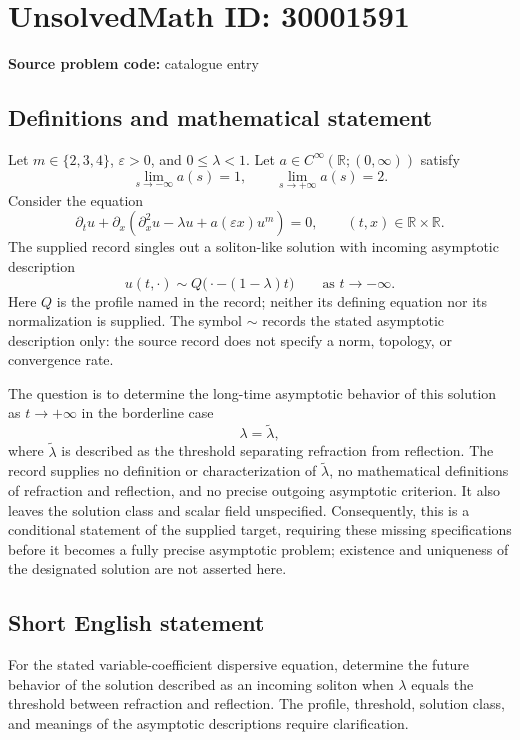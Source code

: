 \documentclass[11pt]{article}
\newcommand{\R}{\mathbb{R}}
\begin{document}
\section*{UnsolvedMath ID: 30001591}
\textbf{Source problem code:} catalogue entry
\subsection{Definitions and mathematical statement}
Let \(m\in\{2,3,4\}\), \(\varepsilon>0\), and \(0\leq\lambda<1\). Let \(a\in C^\infty(\R;(0,\infty))\) satisfy
\[
\lim_{s\to-\infty}a(s)=1,
\qquad
\lim_{s\to+\infty}a(s)=2.
\]
Consider the equation
\[
\partial_tu+\partial_x\!\left(\partial_x^2u-\lambda u+a(\varepsilon x)u^m\right)=0,
\qquad (t,x)\in\R\times\R.
\]
The supplied record singles out a soliton-like solution with incoming asymptotic description
\[
u(t,\cdot)\sim Q\bigl(\cdot-(1-\lambda)t\bigr)
\qquad\text{as }t\to-\infty.
\]
Here \(Q\) is the profile named in the record; neither its defining equation nor its normalization is supplied. The symbol \(\sim\) records the stated asymptotic description only: the source record does not specify a norm, topology, or convergence rate.

The question is to determine the long-time asymptotic behavior of this solution as \(t\to+\infty\) in the borderline case
\[
\lambda=\widetilde\lambda,
\]
where \(\widetilde\lambda\) is described as the threshold separating refraction from reflection. The record supplies no definition or characterization of \(\widetilde\lambda\), no mathematical definitions of refraction and reflection, and no precise outgoing asymptotic criterion. It also leaves the solution class and scalar field unspecified. Consequently, this is a conditional statement of the supplied target, requiring these missing specifications before it becomes a fully precise asymptotic problem; existence and uniqueness of the designated solution are not asserted here.
\subsection{Short English statement}
For the stated variable-coefficient dispersive equation, determine the future behavior of the solution described as an incoming soliton when \(\lambda\) equals the threshold between refraction and reflection. The profile, threshold, solution class, and meanings of the asymptotic descriptions require clarification.
\end{document}
